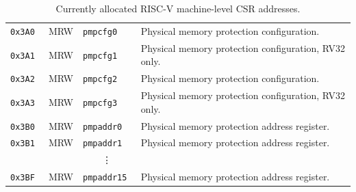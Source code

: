 \begin{table}[htb!]
\begin{center}
\begin{tabular}{|l|l|l|l|}
\hline
\tt 0x3A0 & MRW  &\tt pmpcfg0    & Physical memory protection configuration. \\
\tt 0x3A1 & MRW  &\tt pmpcfg1    & Physical memory protection configuration, RV32 only. \\
\tt 0x3A2 & MRW  &\tt pmpcfg2    & Physical memory protection configuration. \\
\tt 0x3A3 & MRW  &\tt pmpcfg3    & Physical memory protection configuration, RV32 only. \\
\tt 0x3B0 & MRW  &\tt pmpaddr0   & Physical memory protection address register. \\
\tt 0x3B1 & MRW  &\tt pmpaddr1   & Physical memory protection address register. \\
& & \multicolumn{1}{c|}{\vdots} & \ \\
\tt 0x3BF & MRW  &\tt pmpaddr15  & Physical memory protection address register. \\
\hline
\end{tabular}
\end{center}
\caption{Currently allocated RISC-V machine-level CSR addresses.}
\label{mcsrnames0}
\end{table}

